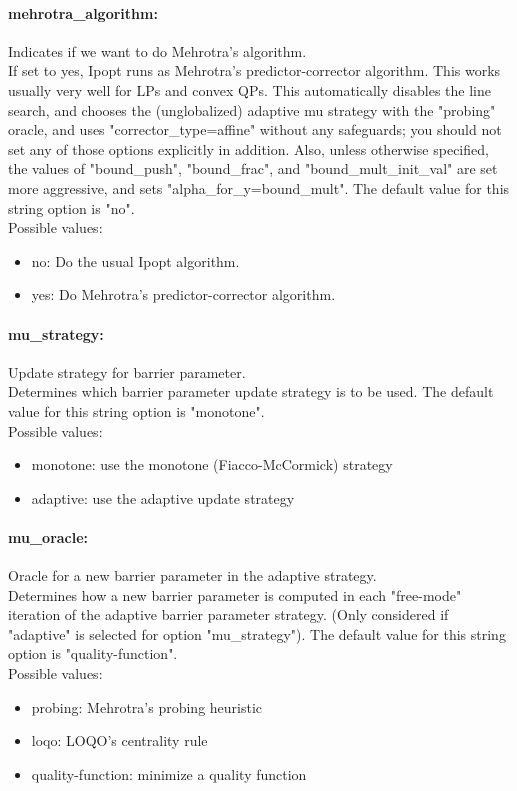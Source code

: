 \paragraph{mehrotra\_algorithm:}\label{opt:mehrotra_algorithm} Indicates if we want to do Mehrotra's algorithm. \\
 If set to yes, Ipopt runs as Mehrotra's predictor-corrector algorithm. This works usually very well for LPs and convex QPs.  This automatically disables the line search, and chooses the (unglobalized) adaptive mu strategy with the "probing" oracle, and uses "corrector\_type=affine" without any safeguards; you should not set any of those options explicitly in addition.  Also, unless otherwise specified, the values of "bound\_push", "bound\_frac", and "bound\_mult\_init\_val" are set more aggressive, and sets "alpha\_for\_y=bound\_mult". The default value for this string option is "no".
\\ 
Possible values:
\begin{itemize}
   \item no: Do the usual Ipopt algorithm.
   \item yes: Do Mehrotra's predictor-corrector algorithm.
\end{itemize}

\paragraph{mu\_strategy:}\label{opt:mu_strategy} Update strategy for barrier parameter. \\
 Determines which barrier parameter update strategy is to be used. The default value for this string option is "monotone".
\\ 
Possible values:
\begin{itemize}
   \item monotone: use the monotone (Fiacco-McCormick) strategy
   \item adaptive: use the adaptive update strategy
\end{itemize}

\paragraph{mu\_oracle:}\label{opt:mu_oracle} Oracle for a new barrier parameter in the adaptive strategy. \\
 Determines how a new barrier parameter is computed in each "free-mode" iteration of the adaptive barrier parameter strategy. (Only considered if "adaptive" is selected for option "mu\_strategy"). The default value for this string option is "quality-function".
\\ 
Possible values:
\begin{itemize}
   \item probing: Mehrotra's probing heuristic
   \item loqo: LOQO's centrality rule
   \item quality-function: minimize a quality function
\end{itemize}

